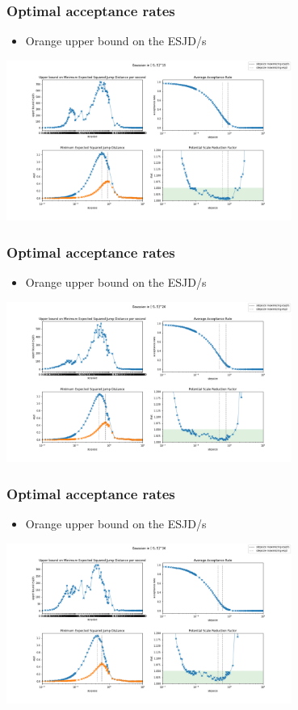 \begin{frame}[t]
    \frametitle{Optimal acceptance rates}
    \begin{itemize}
    \item {\color{orange} Orange } upper bound on the ESJD/s
    \end{itemize}
    \centering
    \includegraphics[width=0.7\textwidth]{imgs/bound-5-dim-15-Gaussian-results.png}
\end{frame}

\begin{frame}[t]
    \frametitle{Optimal acceptance rates}
    \begin{itemize}
    \item {\color{orange} Orange } upper bound on the ESJD/s
    \end{itemize}
    \centering
    \includegraphics[width=0.7\textwidth]{imgs/bound-5-dim-20-Gaussian-results.png}
\end{frame}

\begin{frame}[t]
    \frametitle{Optimal acceptance rates}
    \begin{itemize}
    \item {\color{orange} Orange } upper bound on the ESJD/s
    \end{itemize}
    \centering
    \includegraphics[width=0.7\textwidth]{imgs/bound-5-dim-30-Gaussian-results.png}
\end{frame}

